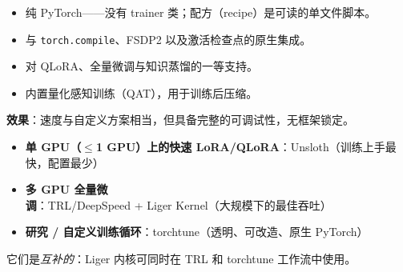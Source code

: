 \begin{itemize}
  \item 纯 PyTorch——没有 trainer 类；配方（recipe）是可读的单文件脚本。
  \item 与 \texttt{torch.compile}、FSDP2 以及激活检查点的原生集成。
  \item 对 QLoRA、全量微调与知识蒸馏的一等支持。
  \item 内置量化感知训练（QAT），用于训练后压缩。
\end{itemize}

\textbf{效果}：速度与自定义方案相当，但具备完整的可调试性，无框架锁定。

\begin{keybox}[选择效率栈]
\begin{itemize}
  \item \textbf{单 GPU（$\leq$1 GPU）上的快速 LoRA/QLoRA}：Unsloth（训练上手最快，配置最少）
  \item \textbf{多 GPU 全量微调}：TRL/DeepSpeed + Liger Kernel（大规模下的最佳吞吐）
  \item \textbf{研究 / 自定义训练循环}：torchtune（透明、可改造、原生 PyTorch）
\end{itemize}

它们是\emph{互补的}：Liger 内核可同时在 TRL 和 torchtune 工作流中使用。
\end{keybox}

